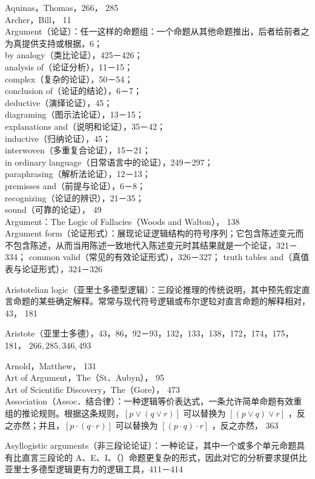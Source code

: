 Aquinas，Thomas，266， 285\\
Archer，Bill， 11\\
Argument（论证）：任一这样的命题组：一个命题从其他命题推出，后者给前者之为真提供支持或根据，6；\\
by analogy（类比论证），425－426；\\
analysis of（论证分析），11－15；\\
complex（复杂的论证），50－54；\\
conclusion of（论证的结论），6－7；\\
deductive（演绎论证），45；\\
diagraming（图示法论证），13－15；\\
explanations and（说明和论证），35－42；\\
inductive（归纳论证），45；\\
interwoven（多重复合论证），15－21；\\
in ordinary language（日常语言中的论证），249－297；\\
paraphrasing（解析法论证），12－13；\\
premisses and（前提与论证），6－8；\\
recognizing（论证的辨识），21－35；\\
sound（可靠的论证）， 49\\
Argument：The Logic of Fallacies（Woods and Walton）， 138\\
Argument form（论证形式）：展现论证逻辑结构的符号序列；它包含陈述变元而不包含陈述，从而当用陈述一致地代入陈述变元时其结果就是一个论证，321－334； common valid（常见的有效论证形式），326－327； truth tables and（真值表与论证形式），324－326

Aristotelian logic（亚里士多德型逻辑）：三段论推理的传统说明，其中预先假定直言命题的某些确定解释。常常与现代符号逻辑或布尔逻䢂对直言命题的解释相对， 43， 181

Aristote（亚里士多德），43，86，92－93，132，133，138，172，174，175，181， $266,285,346,493$

Arnold，Matthew， 131\\
Art of Argument，The（St．Aubyn）， 95\\
Art of Scientific Discovery，The（Gore）， 473\\
Association（Assoc．结合律）：一种逻辑等价表达式，一条允许简单命题有效重组的推论规则。根据这条规则，$[p \vee(q \vee r)]$ 可以替换为 $[(p \vee q) \vee r]$ ，反之亦然；并且，$[p \cdot(q \cdot r)]$ 可以替换为 $[(p \cdot q) \cdot r]$ ，反之亦然， 363

Asyllogistic arguments（非三段论论证）：一种论证，其中一个或多个单元命题具有比直言三段论的 A、E、I、（）命题更复杂的形式，因此对它的分析要求提供比亚里士多德型逻辑更有力的逻辑工具，411－414

